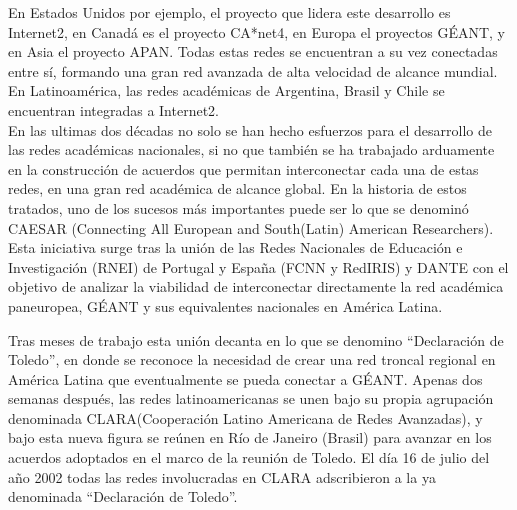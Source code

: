 En Estados Unidos por ejemplo, el proyecto que lidera este desarrollo es Internet2\citep{Internet2}, en Canadá es el proyecto CA*net4\citep{Canarie}, en Europa el proyectos GÉANT\citep{GEANT}, y en Asia el proyecto APAN\citep{APAN}. Todas estas redes se encuentran a su vez conectadas entre sí, formando una gran red avanzada de alta velocidad de alcance mundial. En Latinoamérica, las redes académicas de Argentina, Brasil y Chile se encuentran integradas a Internet2.\\

En las ultimas dos d\'ecadas no solo se han hecho esfuerzos para el desarrollo de las redes académicas nacionales, si no que también se ha trabajado arduamente en la construcción de acuerdos que permitan interconectar cada una de estas redes, en una gran red académica de alcance global. En la historia de estos tratados, uno de los sucesos m\'as importantes puede ser lo que se denomin\'o CAESAR (Connecting All European and South(Latin) American Researchers). Esta iniciativa surge tras la unión de las Redes Nacionales de Educación e Investigación (RNEI) de Portugal y España (FCNN y RedIRIS) y DANTE con el objetivo de analizar la viabilidad de interconectar directamente la red académica paneuropea, GÉANT y sus equivalentes nacionales en América Latina.


Tras meses de trabajo esta unión decanta en lo que se denomino “Declaración de Toledo”, en donde se reconoce la necesidad de crear una red troncal regional en América Latina que eventualmente se pueda conectar a GÉANT. Apenas dos semanas después, las redes latinoamericanas se unen bajo su propia agrupación denominada CLARA(Cooperación Latino Americana de Redes Avanzadas), y bajo esta nueva figura se reúnen en Río de Janeiro (Brasil) para avanzar en los acuerdos adoptados en el marco de la reunión de Toledo. El día 16 de julio del año 2002 todas las redes involucradas en CLARA adscribieron a la ya denominada “Declaración de Toledo”.\\

